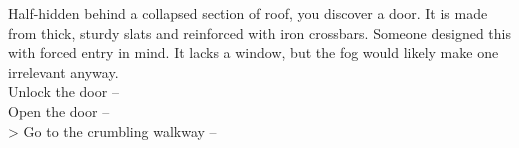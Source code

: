 Half-hidden behind a collapsed section of roof, you discover a door. It is made from thick, sturdy slats and reinforced with iron crossbars. Someone designed this with forced entry in mind. It lacks a window, but the fog would likely make one irrelevant anyway.\\

 Unlock the door -- \\
 Open the door -- \\
> Go to the crumbling walkway -- 